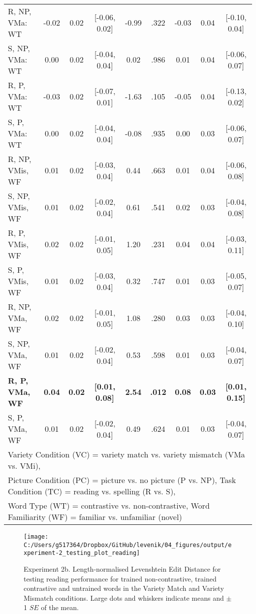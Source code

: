 \documentclass[doc,floatsintext]{apa6}
\begin{document}
\begin{table}[!h]
{\begin{tabular}{lcccccccc}
R, NP, VMa: WT & -0.02 & 0.02 & [-0.06, 0.02] & -0.99 & .322 & -0.03 & 0.04 & [-0.10, 0.04]\\
S, NP, VMa: WT & 0.00 & 0.02 & [-0.04, 0.04] & 0.02 & .986 & 0.01 & 0.04 & [-0.06, 0.07]\\
R, P, VMa: WT & -0.03 & 0.02 & [-0.07, 0.01] & -1.63 & .105 & -0.05 & 0.04 & [-0.13, 0.02]\\
S, P, VMa: WT & 0.00 & 0.02 & [-0.04, 0.04] & -0.08 & .935 & 0.00 & 0.03 & [-0.06, 0.07]\\
R, NP, VMis, WF & 0.01 & 0.02 & [-0.03, 0.04] & 0.44 & .663 & 0.01 & 0.04 & [-0.06, 0.08]\\
S, NP, VMis, WF & 0.01 & 0.02 & [-0.02, 0.04] & 0.61 & .541 & 0.02 & 0.03 & [-0.04, 0.08]\\
R, P, VMis, WF & 0.02 & 0.02 & [-0.01, 0.05] & 1.20 & .231 & 0.04 & 0.04 & [-0.03, 0.11]\\
S, P, VMis, WF & 0.01 & 0.02 & [-0.03, 0.04] & 0.32 & .747 & 0.01 & 0.03 & [-0.05, 0.07]\\
R, NP, VMa, WF & 0.02 & 0.02 & [-0.01, 0.05] & 1.08 & .280 & 0.03 & 0.03 & [-0.04, 0.10]\\
S, NP, VMa, WF & 0.01 & 0.02 & [-0.02, 0.04] & 0.53 & .598 & 0.01 & 0.03 & [-0.04, 0.07]\\
\textbf{R, P, VMa, WF} & \textbf{0.04} & \textbf{0.02} & \textbf{[0.01, 0.08]} & \textbf{2.54} & \textbf{.012} & \textbf{0.08} & \textbf{0.03} & \textbf{[0.01, 0.15]}\\
S, P, VMa, WF & 0.01 & 0.02 & [-0.02, 0.04] & 0.49 & .624 & 0.01 & 0.03 & [-0.04, 0.07]\\
\bottomrule
\multicolumn{9}{l}{Variety Condition (VC) = variety match vs. variety mismatch (VMa vs. VMi),}\\
\multicolumn{9}{l}{Picture Condition (PC) = picture vs. no picture (P vs. NP), Task Condition (TC) = reading vs. spelling (R vs. S),}\\
\multicolumn{9}{l}{Word Type (WT) = contrastive vs. non-contrastive, Word Familiarity (WF) = familiar vs. unfamiliar (novel)}\\
\end{tabular}}
\end{table}

\begin{figure}[H]

{\centering \texttt{[image: C:/Users/g517364/Dropbox/GitHub/levenik/04\_figures/output/experiment-2\_testing\_plot\_reading]} 

}

\caption{Experiment 2b. Length-normalised Levenshtein Edit Distance for testing reading performance for trained non-contrastive, trained contrastive and untrained words in the Variety Match and Variety Mismatch conditions. Large dots and whiskers indicate means and $\pm$ 1 $SE$ of the mean.}\label{fig:ex2-test-reading-plots}
\end{figure}
\end{document}
